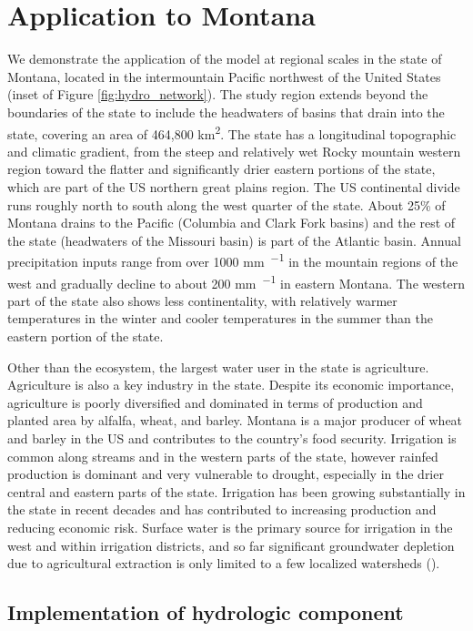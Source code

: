\section{Application to Montana}

We demonstrate the application of the model at regional scales in the state of Montana, located in the intermountain Pacific northwest of the United States (inset of Figure \ref{fig:hydro_network}). The study region extends beyond the boundaries of the state to include the headwaters of basins that drain into the state, covering an area of 464,800 \si{\kilo\meter\squared}. The state has a longitudinal topographic and climatic gradient, from the steep and relatively wet Rocky mountain western region toward the flatter and significantly drier eastern portions of the state, which are part of the US northern great plains region. The US continental divide runs roughly north to south along the west quarter of the state. About 25\% of  Montana drains to the Pacific (Columbia and Clark Fork basins) and the rest of the state (headwaters of the Missouri basin) is part of the Atlantic basin. Annual precipitation inputs range from over 1000 \si{\milli\meter\per\year} in the mountain regions of the west and gradually decline to about 200 \si{\milli\meter\per\year} in eastern Montana. The western part of the state also shows less continentality, with relatively warmer temperatures in the winter and cooler temperatures in the summer than the eastern portion of the state. 

Other than the ecosystem, the largest water user in the state is agriculture. Agriculture is also a key industry in the state. Despite its economic importance, agriculture is poorly diversified and dominated in terms of production and planted area by alfalfa, wheat, and barley. Montana is a major producer of wheat and barley in the US and contributes to the country's food security. Irrigation is common along streams and in the western parts of the state, however rainfed production is dominant and very vulnerable to drought, especially in the drier central and eastern parts of the state. Irrigation has been growing substantially in the state in recent decades and has contributed to increasing production and reducing economic risk. Surface water is the primary source for irrigation in the west and within irrigation districts, and so far significant groundwater depletion due to agricultural extraction is only limited to a few localized watersheds (\citep[][p. 120]{MCA2017}).

\subsection{Implementation of hydrologic component}

